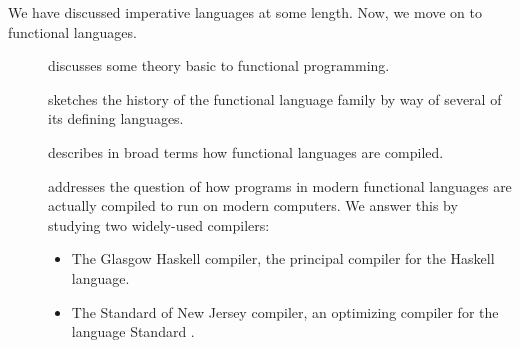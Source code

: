 \label{functional:overview}
We have discussed imperative languages at some length. Now, we move on to functional languages.

\begin{description}
\item[] discusses some theory basic to functional programming.
\item[] sketches the history of the functional language family by way of several of its defining languages.
\item[] describes in broad terms how functional languages are compiled. %
\item[] addresses the question of how programs in modern functional languages are actually compiled to run on modern computers. We answer this by studying two widely-used compilers:
\begin{itemize}
\item The Glasgow Haskell compiler, the principal compiler for the Haskell language.
\item The Standard \ML of New Jersey compiler, an optimizing compiler for the language Standard \ML{}.
\end{itemize}
\end{description}